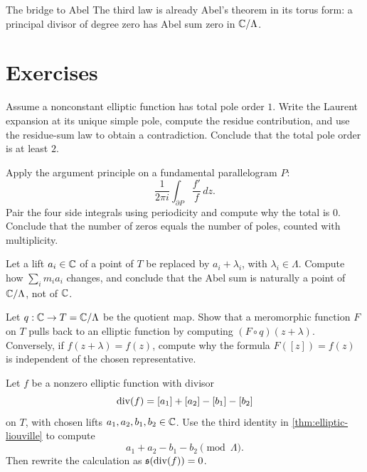 \begin{keyidea}{The bridge to Abel}
The third law is already Abel's theorem in its torus form: a principal divisor of
degree zero has Abel sum zero in \(\mathbb{C}/\Lambda\).
\end{keyidea}

\section*{Exercises}

\begin{exercise}
Assume a nonconstant elliptic function has total pole order \(1\).  Write the
Laurent expansion at its unique simple pole, compute the residue contribution,
and use the residue-sum law to obtain a contradiction.  Conclude that the total
pole order is at least \(2\).
\end{exercise}

\begin{exercise}
Apply the argument principle on a fundamental parallelogram \(P\):
\[
  \frac{1}{2\pi i}\int_{\partial P}\frac{f'}{f}\,dz.
\]
Pair the four side integrals using periodicity and compute why the total is
\(0\).  Conclude that the number of zeros equals the number of poles, counted
with multiplicity.
\end{exercise}

\begin{exercise}
Let a lift \(a_i\in\mathbb{C}\) of a point of \(T\) be replaced by \(a_i+\lambda_i\),
with \(\lambda_i\in\Lambda\).  Compute how
\(\sum_i m_i a_i\) changes, and conclude that the Abel sum is naturally a point
of \(\mathbb{C}/\Lambda\), not of \(\mathbb{C}\).
\end{exercise}

\begin{exercise}
Let \(q:\mathbb{C}\to T=\mathbb{C}/\Lambda\) be the quotient map.  Show that a meromorphic
function \(F\) on \(T\) pulls back to an elliptic function by computing
\((F\circ q)(z+\lambda)\).  Conversely, if \(f(z+\lambda)=f(z)\), compute why
the formula \(F([z])=f(z)\) is independent of the chosen representative.
\end{exercise}

\begin{exercise}
Let \(f\) be a nonzero elliptic function with divisor
\[
  \operatorname{div}(f)=[a_1]+[a_2]-[b_1]-[b_2]
\]
on \(T\), with chosen lifts \(a_1,a_2,b_1,b_2\in\mathbb{C}\).  Use the third identity
in \cref{thm:elliptic-liouville} to compute
\[
  a_1+a_2-b_1-b_2\pmod{\Lambda}.
\]
Then rewrite the calculation as \(\mathfrak{s}(\operatorname{div}(f))=0\).
\end{exercise}
